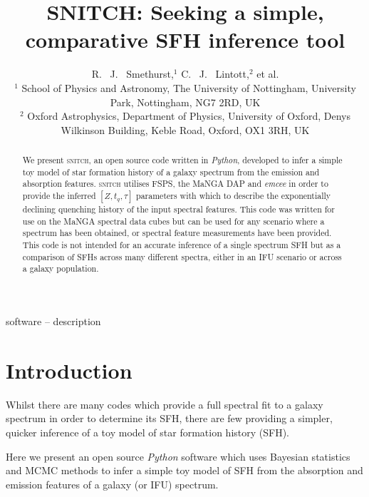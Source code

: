 \documentclass[useAMS,usenatbib]{mn2e}
\begin{document}
\title[\textsc{snitch}: inferring quenching histories]{SNITCH: Seeking a simple, comparative SFH inference tool}
\author[Smethurst et al. 2018]{R. ~J. ~Smethurst,$^{1}$ C. ~J. ~Lintott,$^{2}$ et al.
\\ $^1$ School of Physics and Astronomy, The University of Nottingham, University Park, Nottingham, NG7 2RD, UK
\\ $^2$ Oxford Astrophysics, Department of Physics, University of Oxford, Denys Wilkinson Building, Keble Road, Oxford, OX1 3RH, UK
}

\maketitle

\begin{abstract}
We present \textsc{snitch}, an open source code written in \emph{Python}, developed to infer a simple toy model of star formation history of a galaxy spectrum from the emission and absorption features. \textsc{snitch} utilises FSPS, the MaNGA DAP and \emph{emcee} in order to provide the inferred $[Z, t_q, \tau]$ parameters with which to describe the exponentially declining quenching history of the input spectral features. This code was written for use on the MaNGA spectral data cubes but can be used for any scenario where a spectrum has been obtained, or spectral feature measurements have been provided. This code is not intended for an accurate inference of a single spectrum SFH but as a comparison of SFHs across many different spectra, either in an IFU scenario or across a galaxy population.
\end{abstract}

\begin{keywords}
software -- description
\end{keywords}

\section{Introduction}

Whilst there are many codes which provide a full spectral fit to a galaxy spectrum in order to determine its SFH, there are few providing a simpler, quicker inference of a toy model of star formation history (SFH). 

Here we present an open source \emph{Python} software which uses Bayesian statistics and MCMC methods to infer a simple toy model of SFH from the absorption and emission features of a galaxy (or IFU) spectrum. 
\end{document}
